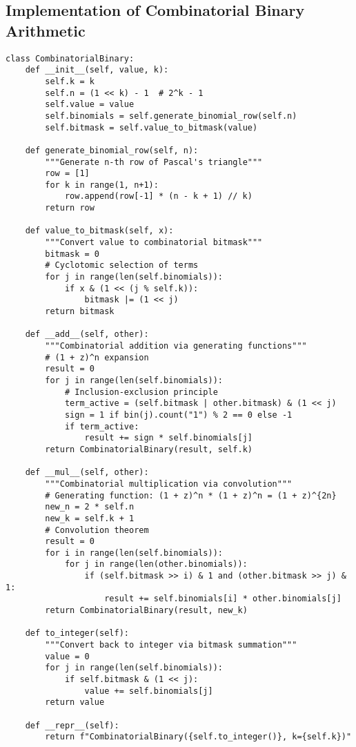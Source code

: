 \subsection{Implementation of Combinatorial Binary Arithmetic}
\begin{verbatim}
class CombinatorialBinary:
    def __init__(self, value, k):
        self.k = k
        self.n = (1 << k) - 1  # 2^k - 1
        self.value = value
        self.binomials = self.generate_binomial_row(self.n)
        self.bitmask = self.value_to_bitmask(value)
    
    def generate_binomial_row(self, n):
        """Generate n-th row of Pascal's triangle"""
        row = [1]
        for k in range(1, n+1):
            row.append(row[-1] * (n - k + 1) // k)
        return row
    
    def value_to_bitmask(self, x):
        """Convert value to combinatorial bitmask"""
        bitmask = 0
        # Cyclotomic selection of terms
        for j in range(len(self.binomials)):
            if x & (1 << (j % self.k)):
                bitmask |= (1 << j)
        return bitmask
    
    def __add__(self, other):
        """Combinatorial addition via generating functions"""
        # (1 + z)^n expansion
        result = 0
        for j in range(len(self.binomials)):
            # Inclusion-exclusion principle
            term_active = (self.bitmask | other.bitmask) & (1 << j)
            sign = 1 if bin(j).count("1") % 2 == 0 else -1
            if term_active:
                result += sign * self.binomials[j]
        return CombinatorialBinary(result, self.k)
    
    def __mul__(self, other):
        """Combinatorial multiplication via convolution"""
        # Generating function: (1 + z)^n * (1 + z)^n = (1 + z)^{2n}
        new_n = 2 * self.n
        new_k = self.k + 1
        # Convolution theorem
        result = 0
        for i in range(len(self.binomials)):
            for j in range(len(other.binomials)):
                if (self.bitmask >> i) & 1 and (other.bitmask >> j) & 1:
                    result += self.binomials[i] * other.binomials[j]
        return CombinatorialBinary(result, new_k)
    
    def to_integer(self):
        """Convert back to integer via bitmask summation"""
        value = 0
        for j in range(len(self.binomials)):
            if self.bitmask & (1 << j):
                value += self.binomials[j]
        return value

    def __repr__(self):
        return f"CombinatorialBinary({self.to_integer()}, k={self.k})"
\end{verbatim}

